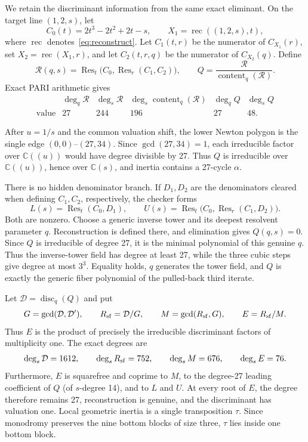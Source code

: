 \documentclass[11pt]{article}
\newcommand{\C}{\mathbb C}
\newcommand{\disc}{\operatorname{disc}}
\begin{document}
We retain the discriminant information from the same exact eliminant.  On the
target line $(1,2,s)$, let
\[
C_0(t)=2t^3-2t^2+2t-s,\qquad X_1=\operatorname{rec}((1,2,s),t),
\]
where $\operatorname{rec}$ denotes~\eqref{eq:reconstruct}.  Let $C_1(t,r)$
be the numerator of $C_{X_1}(r)$, set
$X_2=\operatorname{rec}(X_1,r)$, and let $C_2(t,r,q)$ be the numerator of
$C_{X_2}(q)$.  Define
\[
\mathcal R(q,s)=\operatorname{Res}_t
 \bigl(C_0,\operatorname{Res}_r(C_1,C_2)\bigr),
\qquad
Q=\frac{\mathcal R}{\operatorname{content}_q(\mathcal R)}.
\]
Exact PARI arithmetic gives
\[
\begin{array}{c|ccccc}
 &\deg_q\mathcal R&\deg_s\mathcal R&
 \deg_s\operatorname{content}_q(\mathcal R)&\deg_qQ&\deg_sQ\\ \hline
\text{value}&27&244&196&27&48.
\end{array}
\]

After $u=1/s$ and the common valuation shift, the lower Newton polygon is the
single edge $(0,0)$--$(27,34)$. Since $\gcd(27,34)=1$, each irreducible
factor over $\C((u))$ would have degree divisible by 27. Thus $Q$ is
irreducible over $\C((u))$, hence over $\C(s)$, and inertia contains a
27-cycle $\alpha$.

There is no hidden denominator branch. If $D_1,D_2$ are the denominators
cleared when defining $C_1,C_2$, respectively, the checker forms
\[
L(s)=\operatorname{Res}_t(C_0,D_1),\qquad
U(s)=\operatorname{Res}_t
 \bigl(C_0,\operatorname{Res}_r(C_1,D_2)\bigr).
\]
Both are nonzero. Choose a generic inverse tower and its deepest resolvent
parameter $q$. Reconstruction is defined there, and elimination gives
$Q(q,s)=0$. Since $Q$ is irreducible of degree 27, it is the minimal
polynomial of this genuine $q$. Thus the inverse-tower field has degree at
least 27, while the three cubic steps give degree at most $3^3$. Equality
holds, $q$ generates the tower field, and $Q$ is exactly the generic fiber
polynomial of the pulled-back third iterate.

Let $\mathcal D=\disc_q(Q)$ and put
\[
G=\gcd(\mathcal D,\mathcal D'),\qquad
R_{\rm sf}=\mathcal D/G,\qquad
M=\gcd(R_{\rm sf},G),\qquad E=R_{\rm sf}/M.
\]
Thus $E$ is the product of precisely the irreducible discriminant factors of
multiplicity one. The exact degrees are
\[
\deg_s\mathcal D=1612,\qquad \deg_sR_{\rm sf}=752,\qquad
\deg_sM=676,\qquad \deg_sE=76.
\]
Furthermore, $E$ is squarefree and coprime to $M$, to the degree-27 leading
coefficient of $Q$ (of $s$-degree 14), and to $L$ and $U$.  At every root of
$E$, the degree therefore remains 27, reconstruction is genuine, and the
discriminant has valuation one. Local geometric inertia is a single
transposition $\tau$. Since monodromy preserves the nine bottom blocks of
size three, $\tau$ lies inside one bottom block.
\end{document}

